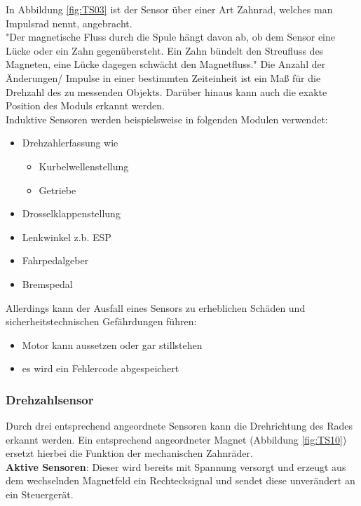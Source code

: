 \begin{flushleft}
				In Abbildung \ref{fig:TS03} ist der Sensor über einer Art Zahnrad, welches man Impulsrad nennt, angebracht.\\
	            
	            "Der magnetische Fluss durch die Spule hängt davon ab, ob dem Sensor eine Lücke oder ein Zahn gegenübersteht. Ein Zahn bündelt den Streufluss des Magneten, eine Lücke dagegen schwächt den Magnetfluss." \cite{TS_ind_funkt}  
				Die Anzahl der Änderungen/ Impulse in einer bestimmten Zeiteinheit ist ein Maß für die Drehzahl des zu messenden Objekts. Darüber hinaus kann auch die exakte Position des Moduls erkannt werden.\\					
	            
				Induktive Sensoren werden beispielsweise in folgenden Modulen verwendet:
				
				\begin{itemize}
					\item Drehzahlerfassung wie
						\begin{itemize}
							\item Kurbelwellenstellung
							\item Getriebe
						\end{itemize}	
					\item Drosselklappenstellung
					\item Lenkwinkel z.b. ESP
					\item Fahrpedalgeber
					\item Bremspedal
				\end{itemize}
			
				Allerdings kann der Ausfall eines Sensors zu erheblichen Schäden und sicherheitstechnischen Gefährdungen führen:
				\begin{itemize}
					\item Motor kann aussetzen oder gar stillstehen
					\item es wird ein Fehlercode abgespeichert
	            \end{itemize}
	           
	           
	           \subsubsection{Drehzahlsensor}
		           
		           Durch drei entsprechend angeordnete Sensoren kann die Drehrichtung des Rades erkannt werden. Ein entsprechend angeordneter Magnet (Abbildung \ref{fig:TS10}) ersetzt hierbei die Funktion der mechanischen Zahnräder.\\
		           \textbf{Aktive Sensoren}: Dieser wird bereits mit Spannung versorgt und erzeugt aus dem wechselnden Magnetfeld ein Rechtecksignal und sendet diese unverändert an ein Steuergerät.
		           

\end{flushleft}
